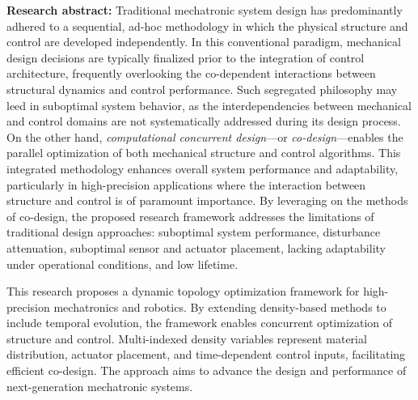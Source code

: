 \textbf{Research abstract:} Traditional mechatronic system design has
predominantly adhered to a sequential, ad-hoc methodology in which the
physical structure and control are developed independently. In this
conventional paradigm, mechanical design decisions are typically
finalized prior to the integration of control architecture, frequently
overlooking the co-dependent interactions between structural dynamics
and control performance. Such segregated philosophy may leed in
suboptimal system behavior, as the interdependencies between mechanical
and control domains are not systematically addressed during its design
process. On the other hand, \emph{computational concurrent design}---or
\emph{co-design}---enables the parallel optimization of both mechanical
structure and control algorithms. This integrated methodology enhances
overall system performance and adaptability, particularly in
high-precision applications where the interaction between structure and
control is of paramount importance. By leveraging on the methods of
co-design, the proposed research framework addresses the limitations of
traditional design approaches: suboptimal system performance,
disturbance attenuation, suboptimal sensor and actuator placement,
lacking adaptability under operational conditions, and low lifetime.

This research proposes a dynamic topology optimization framework for
high-precision mechatronics and robotics. By extending density-based
methods to include temporal evolution, the framework enables concurrent
optimization of structure and control. Multi-indexed density variables
represent material distribution, actuator placement, and time-dependent
control inputs, facilitating efficient co-design. The approach aims to
advance the design and performance of next-generation mechatronic
systems.

